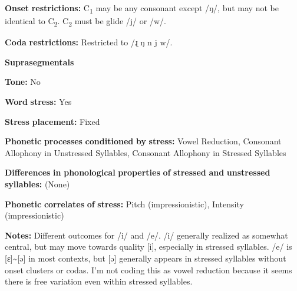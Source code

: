 \documentclass[output=paper]{langsci/langscibook}
\begin{document}
\begin{styleBody}
\textbf{Onset} \textbf{restrictions:} C\textsubscript{1} may be any consonant except /ŋ/, but may not be identical to C\textsubscript{2}. C\textsubscript{2} must be glide /j/ or /w/. 
\end{styleBody}

\begin{styleBody}
\textbf{Coda} \textbf{restrictions:} Restricted to /ɻ ŋ n j w/.
\end{styleBody}

\begin{styleBody}
\textbf{Suprasegmentals}
\end{styleBody}

\begin{styleBody}
\textbf{Tone:} No
\end{styleBody}

\begin{styleBody}
\textbf{Word} \textbf{stress:} Yes
\end{styleBody}

\begin{styleBody}
\textbf{Stress} \textbf{placement:} Fixed
\end{styleBody}

\begin{styleBody}
\textbf{Phonetic} \textbf{processes} \textbf{conditioned} \textbf{by} \textbf{stress:} Vowel Reduction, Consonant Allophony in Unstressed Syllables, Consonant Allophony in Stressed Syllables
\end{styleBody}

\begin{styleBody}
\textbf{Differences} \textbf{in} \textbf{phonological} \textbf{properties} \textbf{of} \textbf{stressed} \textbf{and} \textbf{unstressed} \textbf{syllables:} (None)
\end{styleBody}

\begin{styleBody}
\textbf{Phonetic} \textbf{correlates} \textbf{of} \textbf{stress:} Pitch (impressionistic), Intensity (impressionistic)
\end{styleBody}

\begin{styleBody}
\textbf{Notes:} Different outcomes for /i/ and /e/. /i/ generally realized as somewhat central, but may move towards quality [i], especially in stressed syllables. /e/ is [ɛ]{\textasciitilde}[ə] in most contexts, but [ə] generally appears in stressed syllables without onset clusters or codas. I’m not coding this as vowel reduction because it seems there is free variation even within stressed syllables.
\end{styleBody}
\end{document}
